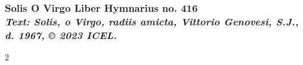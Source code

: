 \subsubsection*{Solis O Virgo \hfill Liber Hymnarius no. 416\\
{\small\itshape Text: Solis, o Virgo, radiis amicta, Vittorio Genovesi, S.J., d. 1967, © 2023 ICEL.}}

\begin{multicols*}{2}
        
\end{multicols*}
